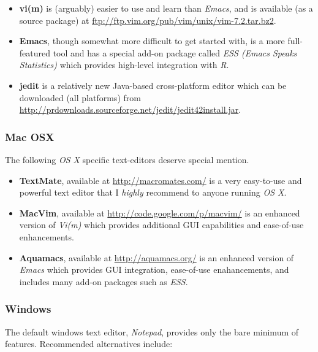 \documentclass[10pt,letterpaper]{article}
\begin{document}
\begin{itemize}
    \item \textbf{vi(m)} is (arguably) easier to use and learn than \emph{Emacs}, and is available (as a source package) at  \url{ftp://ftp.vim.org/pub/vim/unix/vim-7.2.tar.bz2}.
    \item \textbf{Emacs}, though somewhat more difficult to get started with, is a more full-featured tool and has a special add-on package called \emph{ESS (Emacs Speaks Statistics)} which provides high-level integration with \emph{R}.
    \item \textbf{jedit} is a relatively new Java-based cross-platform editor which can be downloaded (all platforms) from  \url{http://prdownloads.sourceforge.net/jedit/jedit42install.jar}.
\end{itemize}

\subsubsection{Mac OSX} %
\label{ssub:mac_osx2}

The following \emph{OS X} specific text-editors deserve special mention.

\begin{itemize}
    \item \textbf{TextMate}, available at \url{http://macromates.com/} is a very easy-to-use and powerful text editor that I \emph{highly} recommend to anyone running \emph{OS X}.
    \item \textbf{MacVim}, available at \url{http://code.google.com/p/macvim/} is an enhanced version of \emph{Vi(m)} which provides additional GUI capabilities and ease-of-use enhancements.
    \item \textbf{Aquamacs}, available at \url{http://aquamacs.org/} is an enhanced version of \emph{Emacs} which provides GUI integration, ease-of-use enahancements, and includes many add-on packages such as \emph{ESS}.
\end{itemize}

\subsubsection{Windows} %
\label{ssub:windows2}

The default windows text editor, \emph{Notepad}, provides only the bare minimum of features.  Recommended alternatives include:
\end{document}
